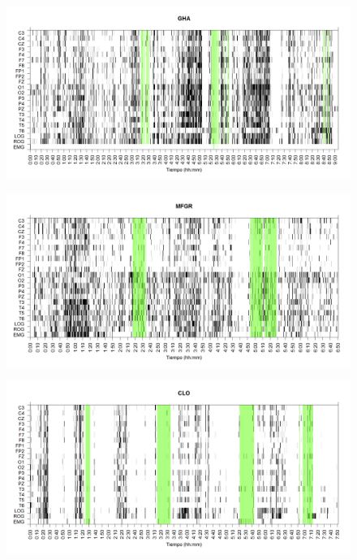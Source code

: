 \documentclass[12pt,a4paper]{mitthesis}
\begin{document}
\begin{figure}
\centering
\includegraphics[width=0.9\linewidth]
{./g170413/GH24031950SUENNO_est.png} 
\label{grf_GHA}
\end{figure}

\begin{figure}
\centering
\includegraphics[width=0.9\linewidth]
{./g170413/GURM251148SUE_est.png} 
\label{grf_MFGR}
\end{figure}


\begin{figure}
\centering
\includegraphics[width=0.9\linewidth]
{./g170413/CLMN10SUE_est.png} 
\label{grf_CLO}
\end{figure}
\end{document}
